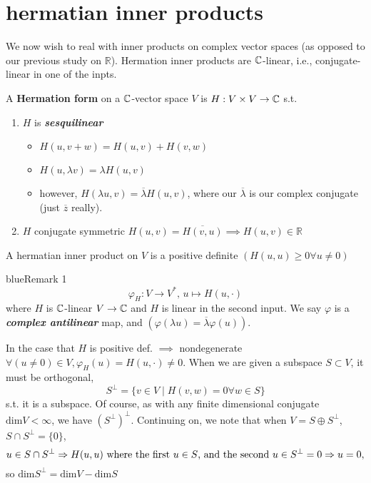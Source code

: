 \documentclass{article}
\begin{document}

\section{hermatian inner products}

We now wish to real with inner products on complex vector spaces (as opposed to our previous study on \( \mathbb{R} \)). Hermation inner products are \( \CC \)-linear, i.e., conjugate-linear in one of the inpts. 

\begin{definition}
A \textbf{Hermation form} on a \( \CC \)-vector space \( V \) is \( H: V\times V \to  \CC[] \) s.t.
\begin{enumerate}
  \item \( H \) is \textbf{\textit{sesquilinear}}
    \begin{itemize}
      \item \( H(u,v+w)=H(u,v)+H(v,w)\)
      \item \( H( u, \lambda v) =\lambda  H (u,v)\)
      \item however, \( H(\lambda u, v)= \overline{\lambda }  H(u,v) \), where our \( \overline{\lambda }  \) is our complex conjugate (just \( \overline{z}  \) really). 
    \end{itemize}
  \item \( H \) conjugate symmetric \( H(u,v)=\overline{H(v,u)} \implies H(u,v) \in  \mathbb{R} \)
\end{enumerate}
\end{definition}

\begin{definition}
  A hermatian inner product on \( V \) is a positive definite  \(  (H(u,u)\ge 0 \forall u \neq 0) \)
\end{definition}

\begin{mybox}{blue}{Remark 1}
  \[
    \varphi _H : V \to  V^*, \, u \mapsto H(u,\cdot )
  \]
  where \( H \) is \( \CC \)-linear \( V \to  \CC \) and \( H \) is linear in the second input. We say \( \varphi  \) is a \textbf{\textit{complex antilinear}} map, and \( (\varphi (\lambda  u ) = \overline{\lambda } \varphi (u) ) \).
\end{mybox}

In the case that \( H \) is positive def. \( \implies \) nondegenerate \( \forall (u \neq 0)\in  V , \varphi _H(u)=H (u,\cdot )\neq 0\). When we are given a subspace \( S \subset  V \), it must be orthogonal, 
\[ S^\perp = \{v \in  V \mid H(v,w)=0 \forall w \in  S\}   \]
s.t. it is a subspace. Of course, as with any finite dimensional conjugate \( \text{dim}V<\infty \), we have \( (S^{\perp})^\perp \). Continuing on, we note that when \( V = S \oplus S^\perp \), \(S \cap S^\perp = \{0\} \), \[
  u \in  S \cap S^\perp \implies H(u,u) \text{ where the first \( u \in  S\), and the second \( u \in  S^\perp \)} =0 \implies u=0,
\] 
so \( \text{dim}S^\perp = \text{dim} V - \text{dim}S \)
\end{document}
